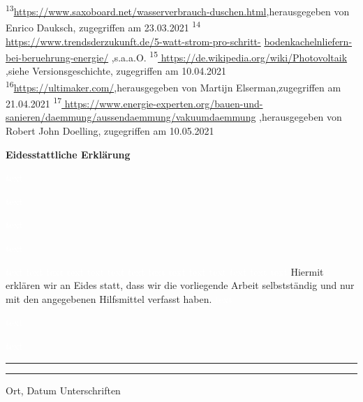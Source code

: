 \begin{thebibliography}{tiefe}
 \textsuperscript{13}\url{https://www.saxoboard.net/wasserverbrauch-duschen.html},herausgegeben von Enrico Dauksch, zugegriffen am 23.03.2021
 \textsuperscript{14}\url { https://www.trendsderzukunft.de/5-watt-strom-pro-schritt-}
\url{bodenkachelnliefern-bei-beruehrung-energie/} ,s.a.a.O.
 \textsuperscript{15}\url { https://de.wikipedia.org/wiki/Photovoltaik} ,siehe Versionsgeschichte, zugegriffen am 10.04.2021
 \textsuperscript{16}\url{https://ultimaker.com/},herausgegeben von Martijn Elserman,zugegriffen am 21.04.2021
 \textsuperscript{17}\url{ https://www.energie-experten.org/bauen-und-sanieren/daemmung/aussendaemmung/vakuumdaemmung} ,herausgegeben von Robert John Doelling, zugegriffen am 10.05.2021
\end{thebibliography}

\newpage
\hspace*{\fill}\Large\textbf{Eidesstattliche Erklärung} \hspace*{\fill}
\par
\textcolor{white}{text}
\par
\textcolor{white}{text}
\par
\textcolor{white}{text}
\par
\textcolor{white}{text}
\par
\textcolor{white}{text}
\textcolor{white}{text}
\textcolor{white}{text}
\textcolor{white}{text}
\textcolor{white}{text}
\textcolor{white}{text}
\textcolor{white}{text}
\textcolor{white}{text}
\textcolor{white}{text}
\textcolor{white}{text}
\textcolor{white}{text}
\textcolor{white}{text}
\textcolor{white}{text}
\textcolor{white}{text}
Hiermit erklären wir an Eides statt, dass wir die vorliegende Arbeit selbstständig und nur mit den angegebenen Hilfsmittel verfasst haben.
\textcolor{white}{text}
\par
\textcolor{white}{text}
\par
\textcolor{white}{text}
\par
\vspace{50pt}
\noindent\rule{5cm}{.4pt}\hfill\rule{5cm}{.4pt}\par
\noindent Ort, Datum \hfill Unterschriften

